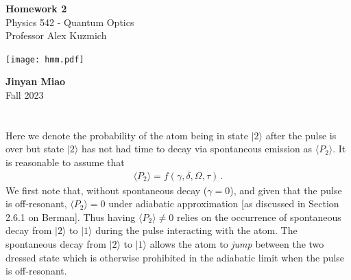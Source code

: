 \documentclass[11pt, oneside]{book}
\theoremstyle{break}
\theoremstyle{break}
\begin{document}
	\begin{titlepage}
		\begin{center}
			\vspace*{0.5cm}
			\Huge \color{red}
				\textbf{Homework 2}\\
			\vspace{0.5cm}			
			\Large \color{black}
			Physics 542 - Quantum Optics\\
			Professor Alex Kuzmich
			\vspace{1.5cm}

			\texttt{[image: hmm.pdf]}
			
			
			\vspace{2cm}
			\LARGE
				\textbf{Jinyan Miao}\\
				\hfill\break
				\LARGE Fall 2023\\
			\vspace{1cm}

		\vspace*{\fill}
		\end{center}			
	\end{titlepage}

\chapter{}
Here we denote the probability of the atom being in state $|2\rangle$ after the pulse is over but state $|2\rangle$ has not had time to decay via spontaneous emission as $\langle P_2\rangle$. It is reasonable to assume that 
\begin{align*}
\langle P_2 \rangle = f(\gamma, \delta, \Omega, \tau)\,.
\end{align*}
We first note that, without spontaneous decay ($\gamma = 0$), and given that the pulse is off-resonant, $\langle P_2\rangle = 0$ under adiabatic approximation [as discussed in Section 2.6.1 on Berman]. Thus having $\langle P_2 \rangle \neq 0$ relies on the occurrence of spontaneous decay from $|2\rangle$ to $|1\rangle$ during the pulse interacting with the atom. The spontaneous decay from $|2\rangle$ to $|1\rangle$ allows the atom to \textit{jump} between the two dressed state which is otherwise prohibited in the adiabatic limit when the pulse is off-resonant.\\
\end{document}
